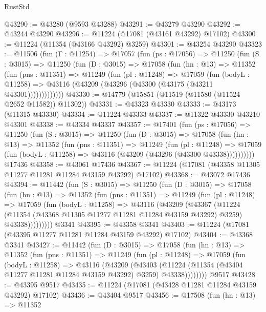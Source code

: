 \begin{lexlean}{RustStd}
\begin{coremodule}
@43290 := @43280 (@9593 @43288)
@43291 := @43279 @43290
@43292 := @43244 @43290
@43296 := @11224 (@17081 (@43161 @43292) @17102)
@43300 := @11224 (@11354 (@43166 @43292) @3259)
@43301 := @43254 @43290
@43323 := @11506
    (fun (Γ : @11254) =>
    @17057
      (fun (ps : @17056) =>
      @11250
        (fun (S : @3015) =>
        @11250
          (fun (D : @3015) =>
          @17058
            (fun (hn : @13) =>
            @11352
              (fun (pns : @11351) =>
              @11249
                (fun (pl : @11248) =>
                @17059
                  (fun (bodyL : @11258) =>
                  @43116 (@43209 (@43296 (@43300 (@43175 (@43211 @43301)))))))))))))
@43330 := @14779 (@15851 (@11519 (@11580 (@11524 @2652 @11582)) @11302))
@43331 := @43323 @43330
@43333 := @43173 (@11315 @43330)
@43334 := @11224 @43333
@43337 := @11322 @43330 @43210 @43301
@43338 := @43334 @43337
@43357 := @17401
    (fun (ps : @17056) =>
    @11250
      (fun (S : @3015) =>
      @11250
        (fun (D : @3015) =>
        @17058
          (fun (hn : @13) =>
          @11352
            (fun (pns : @11351) =>
            @11249
              (fun (pl : @11248) =>
              @17059 (fun (bodyL : @11258) => @43116 (@43209 (@43296 (@43300 @43338))))))))))
    @17436
@43358 := @43061 @17436
@43367 := @11224 (@17081 (@43358 @11305 @11277 @11281 @11284 @43159 @43292) @17102)
@43368 := @43072 @17436
@43394 := @11442
    (fun (S : @3015) =>
    @11250
      (fun (D : @3015) =>
      @17058
        (fun (hn : @13) =>
        @11352
          (fun (pns : @11351) =>
          @11249
            (fun (pl : @11248) =>
            @17059
              (fun (bodyL : @11258) =>
              @43116
                (@43209
                  (@43367
                    (@11224
                      (@11354 (@43368 @11305 @11277 @11281 @11284 @43159 @43292) @3259)
                      @43338)))))))))
    @3341
@43395 := @43358 @3341
@43403 := @11224 (@17081 (@43395 @11277 @11281 @11284 @43159 @43292) @17102)
@43404 := @43368 @3341
@43427 := @11442
    (fun (D : @3015) =>
    @17058
      (fun (hn : @13) =>
      @11352
        (fun (pns : @11351) =>
        @11249
          (fun (pl : @11248) =>
          @17059
            (fun (bodyL : @11258) =>
            @43116
              (@43209
                (@43403
                  (@11224 (@11354 (@43404 @11277 @11281 @11284 @43159 @43292) @3259) @43338))))))))
    @9517
@43428 := @43395 @9517
@43435 := @11224 (@17081 (@43428 @11281 @11284 @43159 @43292) @17102)
@43436 := @43404 @9517
@43456 := @17508
    (fun (hn : @13) =>
    @11352

\end{coremodule}
\end{lexlean}
